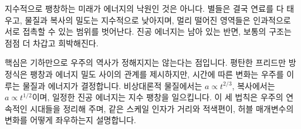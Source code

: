 지수적으로 팽창하는 미래가 에너지의 낙원인 것은 아니다. 별들은 결국 연료를 다 태우고, 물질과 복사의 밀도는 지수적으로 낮아지며, 멀리 떨어진 영역들은 인과적으로 서로 접촉할 수 있는 범위를 벗어난다. 진공 에너지는 남아 있는 반면, 보통의 구조는 점점 더 차갑고 희박해진다.

\begin{classroomqa}
\end{classroomqa}

핵심은 기하만으로 우주의 역사가 정해지지는 않는다는 점입니다. 평탄한 프리드만 방정식은 팽창과 에너지 밀도 사이의 관계를 제시하지만, 시간에 따른 변화는 우주를 이루는 물질과 에너지가 결정합니다. 비상대론적 물질에서는 \(a\propto t^{2/3}\), 복사에서는 \(a\propto t^{1/2}\)이며, 일정한 진공 에너지는 지수 팽창을 일으킵니다. 이 세 법칙은 우주의 연속적인 시대들을 정리해 주며, 같은 스케일 인자가 거리와 적색편이, 허블 매개변수의 변화를 어떻게 좌우하는지 설명합니다.
